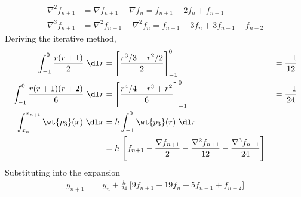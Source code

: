 \begin{enumerate}
\begin{align}
              \nabla^2 f_{n+1} & = \nabla f_{n+1} - \nabla f_{n} =
              f_{n+1} - 2 f_{n} + f_{n-1}                                         \\
              \nabla^3 f_{n+1} & = \nabla^2 f_{n+1} - \nabla^2 f_{n} =
              f_{n+1} - 3 f_{n} + 3 f_{n-1} - f_{n-2}
          \end{align}
          Deriving the iterative method,
          \begin{align}
              \int_{-1}^{0} \frac{r(r+1)}{2}\ \dl r            & =
              \Bigg[ \frac{r^3/3 + r^2/2}{2} \Bigg]_{-1}^0     &
                                                               & = \frac{-1}{12} \\
              \int_{-1}^{0} \frac{r(r+1)(r+2)}{6}\ \dl r       & =
              \Bigg[ \frac{r^4/4 + r^3 + r^2}{6} \Bigg]_{-1}^0 &
                                                               & = \frac{-1}{24} \\
              \int_{x_n}^{x_{n+1}}\wt{p_3}(x)\ \dl x           & =
              h\int_{-1}^{0} \wt{p_3}(r)\ \dl r                                  \\
                                                               &
              = h\ \Bigg[ f_{n+1} - \frac{\nabla f_{n+1}}{2}
                  - \frac{\nabla^2 f_{n+1}}{12} - \frac{\nabla^3 f_{n+1}}{24} \Bigg]
          \end{align}
          Substituting into the expansion
          \begin{align}
              y_{n+1} & = y_n + \frac{h}{24}
              \ \Bigg[ 9f_{n+1} + 19f_n - 5f_{n-1} + f_{n-2}\Bigg]
          \end{align}


\end{enumerate}
